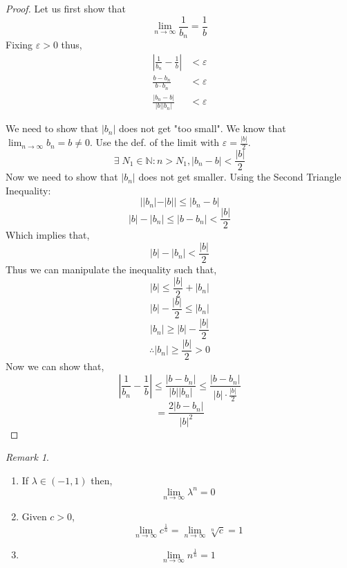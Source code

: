 \documentclass[a4paper, notitlepage]{report}
\newcommand{\dlim}{\displaystyle\lim}
\newtheorem{theorem}{Theorem}
\theoremstyle{remark}
\newtheorem*{remark}{Remark}
\theoremstyle{definition}
\begin{document}
	\begin{center}
	\end{center}
	                \begin{proof}
            Let us first show that
            \[
                \lim_{n\to\infty} \frac{1}{b_n} = \frac{1}{b}\]
            Fixing \(\varepsilon > 0\) thus,
	    \begin{align*}    
	      \left|\frac{1}{b_n} - \frac{1}{b}\right| &< \varepsilon\\
	      \frac{b-b_n}{b\cdot b_n} &< \varepsilon\\
	    \frac{|b_n - b|}{|b||b_n|} &< \varepsilon
	    \end{align*}
            
            We need to show that \(|b_n|\) does not get "too small". We know that \(\dlim_{n\to\infty} b_n = b \neq 0\). Use the def. of the limit with \(\varepsilon = \frac{|b|}{2}\).
            \[\exists \; N_1 \in \mathbb{N} : n > N_1, |b_n - b| < \frac{|b|}{2}\]
            Now we need to show that \(|b_n|\) does not get smaller. Using the Second Triangle Inequality:
            \[
                ||b_n| - |b|| \leq |b_n - b|\]
            \[
                |b| - |b_n| \leq |b - b_n| < \frac{|b|}{2}\]
            Which implies that,
            \[
                |b| - |b_n| < \frac{|b|}{2}\]
            Thus we can manipulate the inequality such that,
            \[
                |b| \leq \frac{|b|}{2} + |b_n|\]
            \[
                |b| - \frac{|b|}{2} \leq |b_n|\]
            \[
                |b_n| \geq |b| - \frac{|b|}{2}\]
            \[
                \therefore |b_n| \geq \frac{|b|}{2} > 0\]
            Now we can show that,
            \[
                |\frac{1}{b_n} - \frac{1}{b}| \leq \frac{|b - b_n|}{|b||b_n|} \leq  \frac{|b - b_n|}{|b| \cdot \frac{|b|}{2}}\]
            \[
                = \frac{2|b-b_n|}{|b|^2}\]
                
        \end{proof}
	\begin{remark}
	\begin{enumerate}
                \item If \(\lambda \in (-1,1)\) then, \[\lim_{n\to\infty} \lambda^n = 0\]
                \item Given \(c > 0\), \[\lim_{n\to\infty} c^{\frac{1}{n}} = \lim_{n\to\infty} \sqrt[n]{c} = 1\]
                \item \[\lim_{n\to\infty} n^{\frac{1}{n}} = 1\]
            \end{enumerate} 
	\end{remark}
\end{document}
